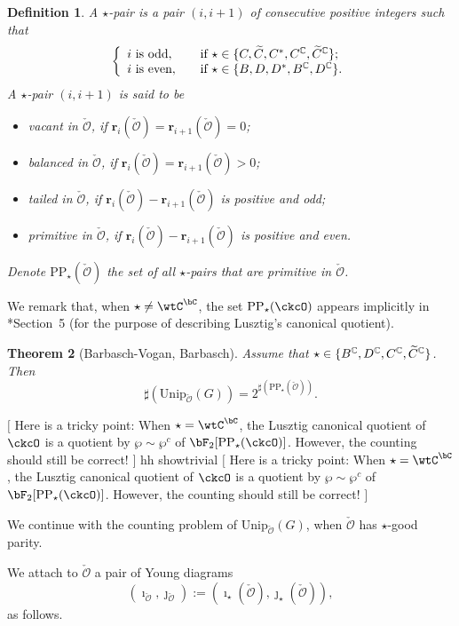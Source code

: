 \documentclass[12pt,a4paper]{amsart}
\newcommand{\trivial}[2][]{\if\relax\detokenize{#1}\relax
  {%
      \color{orange} \vspace{0em} $[$  #2 $]$
      \color{black}
  }
  \else
\ifx#1h
\ifcsname showtrivial\endcsname
{%
    \color{orange} \vspace{0em}  $[$ #2 $]$
    \color{black}
}
\fi
\else {\red Wrong argument!} \fi
\fi
}
\newcommand{\CO}{{\mathcal {O}}}
\numberwithin{equation}{section}
\newtheorem{thm}{Theorem}[section]
\newtheorem{defn}[thm]{Definition}
\theoremstyle{remark}
\def\Unip{\mathrm{Unip}}
\def\CPP{\mathrm{PP}}
\begin{document}
\begin{defn}
  A $\star$-pair is a pair $(i,i+1)$ of consecutive positive integers such that
  \[
    \left\{
      \begin{array}{ll}
        i\textrm{ is odd}, \quad &\textrm{if $\star\in\{C, \widetilde{C}, C^*, C^{\mathbb{C}}, \widetilde C^{\mathbb{C}}\}$};  \\
        i \textrm{ is even}, \quad &\textrm{if $\star\in\{B, D, D^*, B^{\mathbb{C}}, D^{\mathbb{C}}\}$}. \\
      \end{array}
    \right.
  \]
  A $\star$-pair $(i,i+1)$ is said to be
  \begin{itemize}
    \item vacant in $\check \CO$, if
          $\mathbf r_i(\check \CO)=\mathbf r_{i+1}(\check \CO)=0$;
    \item balanced in $\check \CO$, if
          $\mathbf r_i(\check \CO)=\mathbf r_{i+1}(\check \CO)>0$;
    \item tailed in $\check \CO$, if
          $\mathbf r_i(\check \CO)-\mathbf r_{i+1}(\check \CO)$ is positive and
          odd;
    \item primitive in $\check \CO$, if
          $\mathbf r_i(\check \CO)-\mathbf r_{i+1}(\check \CO)$ is positive and
          even.
  \end{itemize}
  Denote $\CPP_\star(\check \CO)$ the set of all $\star$-pairs that are
  primitive in $\check \CO$.
\end{defn}
We remark that, when $\star\neq \wtC^{\bC}$, the set $\CPP_{\star}(\ckcO)$ appears implicitly in
\cite{So}*{Section~5} (for the purpose of describing Lusztig's canonical quotient).


\begin{thm}[Barbasch-Vogan, Barbasch]\label{complex}
  Assume that $\star\in \{B^{\mathbb{C}},D^{\mathbb{C}}, C^{\mathbb{C}}, \widetilde C^{\mathbb{C}}\}$. Then
  \[
    \sharp(\Unip_{\check \CO}(G))=2^{\sharp(\CPP_\star(\check \CO))} .
  \]
\end{thm}
\trivial[h]{ Here is a tricky point: When $\star = \wtC^{\bC}$, the Lusztig
  canonical quotient of $\ckcO$ is a quotient by $\wp\sim \wp^{c}$ of
  $\bF_{2}[\CPP_{\star}(\ckcO)]$. However, the counting should still be correct!
}

\smallskip

We continue with the counting problem of $\Unip_{\check \CO}(G)$, when $\check \CO$ has $\star$-good parity.

We attach to $\check \CO$ a pair of Young diagrams
\[
  (\imath_{\check \CO}, \jmath_{\check \CO}):=(\imath_\star(\check \CO), \jmath_\star(\check \CO)),
\]
as follows.
\end{document}
